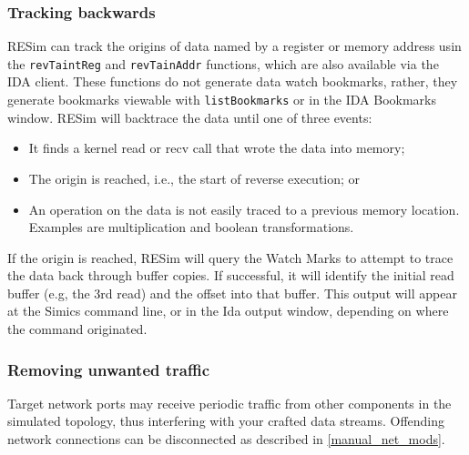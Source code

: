 \documentclass[titlepage]{article}
\begin{document}
\subsubsection{Tracking backwards}
RESim can track the origins of data named by a register or memory address usin the {\tt revTaintReg} and {\tt revTainAddr} functions, which are also
available via the IDA client.  These functions do not generate data watch bookmarks, rather, they generate bookmarks viewable with {\tt listBookmarks} or
in the IDA Bookmarks window.  RESim will backtrace the data until one of three events:
\begin{itemize}
\item It finds a kernel read or recv call that wrote the data into memory;
\item The origin is reached, i.e., the start of reverse execution; or
\item An operation on the data is not easily traced to a previous memory location.  Examples are multiplication and boolean transformations.
\end{itemize}
If the origin is reached, RESim will query the Watch Marks to attempt to trace the data back through buffer copies.  If successful, it will identify
the initial read buffer (e.g, the 3rd read) and the offset into that buffer.  This output will appear at the Simics command line, or in the Ida output
window, depending on where the command originated.

\subsubsection{Removing unwanted traffic}
Target network ports may receive periodic traffic from other components in the simulated topology, thus interfering with your crafted data streams.
Offending network connections can be disconnected as described in \ref{manual_net_mods}.
\end{document}
